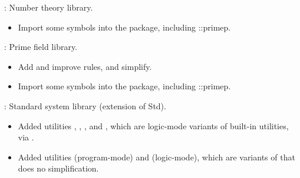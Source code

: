 
\begin{frame}

\implibtitle

:
Number theory library.
\begin{itemize}
\item Import some symbols into the  package, including ::primep.
\end{itemize}

\end{frame}


\begin{frame}

\implibtitle

:
Prime field library.
\begin{itemize}
\item Add and improve rules, and simplify.
\item Import some symbols into the  package, including ::primep.
\end{itemize}

\end{frame}


\begin{frame}

\implibtitle

:
Standard system library (extension of Std).
\begin{itemize}
\item Added utilities
      ,
      ,
      , and
      ,
      which are logic-mode variants of built-in utilities,
      via .
\item Added utilities
       (program-mode) and
       (logic-mode),
      which are variants of  that does no simplification.
\end{itemize}

\end{frame}


